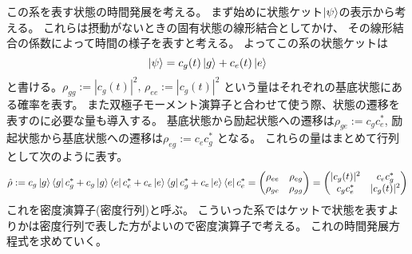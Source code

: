 \documentclass[11pt,dvipdfmx,a4paper]{jsarticle}
\begin{document}
この系を表す状態の時間発展を考える。
まず始めに状態ケット\(\ket{\psi}\)の表示から考える。
これらは摂動がないときの固有状態の線形結合としてかけ、
その線形結合の係数によって時間の様子を表すと考える。
よってこの系の状態ケットは
\begin{equation}
	\ket{\psi} = c_g (t) \ket{g} + c_e (t) \ket{e}
\end{equation}
と書ける。\(\rho_{gg}:=|c_g(t)|^2,\,\rho_{ee}:=|c_g(t)|^2\) という量はそれぞれの基底状態にある確率を表す。
また双極子モーメント演算子と合わせて使う際、状態の遷移を表すのに必要な量も導入する。
基底状態から励起状態への遷移は\(\rho_{ge} := c_g c_e^*\),
励起状態から基底状態への遷移は\(\rho_{eg} := c_e c_g^*\)
となる。
これらの量はまとめて行列として次のように表す。
\begin{equation}
	\hat{\rho} := c_g \ket{g}\bra{g} c_g^*
	+ c_g \ket{g}\bra{e} c_e^*
	+ c_e \ket{e}\bra{g} c_g^*
	+ c_e \ket{e}\bra{e} c_e^*
	=
	\begin{pmatrix}
		\rho_{ee} & \rho_{eg}\\
		\rho_{ge} & \rho_{gg}
	\end{pmatrix}
	=
	\begin{pmatrix}
		|c_g(t)|^2 & c_e c_g^*\\
		c_g c_e^* & |c_g(t)|^2
	\end{pmatrix}
\end{equation}
これを密度演算子(密度行列)と呼ぶ。
こういった系ではケットで状態を表すよりかは密度行列で表した方がよいので密度演算子で考える。
これの時間発展方程式を求めていく。
\end{document}

